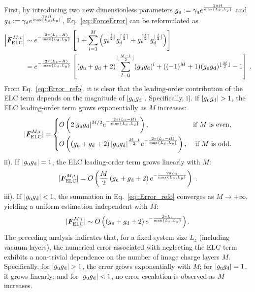 First, by introducing two new dimensionless parameters $g_{\text{u}}:=\gamma_{\text{u}}e^{\frac{2\pi H}{\max\{L_x,L_y\}}}$ and $g_{\text{d}}:=\gamma_{\text{d}}e^{\frac{2\pi H}{\max\{L_x,L_y\}}}$, Eq.~\eqref{eq::ForceError} can be reformulated as
\begin{equation}
   \label{eq::Error_refo}
   \begin{aligned} \left|\bm{F}_{\text{ELC}}^{M,i}\right|&\sim e^{-\frac{2\pi(L_z-H)}{\max\{L_x,L_y\}}} \left[ 1 + \sum_{l=1}^{M} \left( g_{\text{u}}^{\lfloor \frac{l}{2} \rfloor} g_{\text{d}}^{\lceil \frac{l}{2} \rceil} + g_{\text{u}}^{\lceil \frac{l}{2} \rceil} g_{\text{d}}^{\lfloor \frac{l}{2} \rfloor} \right) \right]\\
   &=e^{-\frac{2\pi(L_z-H)}{\max\{L_x,L_y\}}}\left[(g_{\text{u}} + g_{\text{d}} + 2) \sum_{l = 0}^{\lfloor \frac{M - 1}{2} \rfloor} (g_{\text{u}}g_{\text{d}})^{l} + ((-1)^{M}+1) (g_{\text{u}}g_{\text{d}})^{\lfloor \frac{M}{2} \rfloor} - 1\right]\,.
   \end{aligned}
\end{equation}
From Eq.~\eqref{eq::Error_refo}, it is clear that the leading-order contribution of the ELC term depends on the magnitude of $|g_{\text{u}}g_{\text{d}}|$. 
Specifically, i). if $|g_{\text{u}}g_{\text{d}}| > 1$, the ELC leading-order term grows exponentially as $M$ increases:
\begin{equation}\label{eq::lhs_bigger1}
   \lvert\boldsymbol{F}_{\text{ELC}}^{M,i}\rvert =  \left\{
	\begin{aligned}
		& O \left(2 \lvert g_{\text{u}} g_{\text{d}}\rvert^{M/2} e^{-\frac{2\pi (L_z - H)}{\max\{L_x,L_y\}}} \right) , & \text{if $M$ is even,}\\
		& O \left( \left(g_{\text{u}} + g_{\text{d}}+2\right)\lvert g_{\text{u}} g_{\text{d}}\rvert^{\frac{M-1}{2}} e^{-\frac{2\pi (L_z -H)}{\max\{L_x,L_y\}}} \right) , & \text{if $M$ is odd.}
	\end{aligned}
	\right.
\end{equation} 
ii). If $|g_{\text{u}}g_{\text{d}}|=1$, the ELC leading-order term grows linearly with $M$:
\begin{equation}
\label{eq::lhs_1}
\lvert\boldsymbol{F}_{\text{ELC}}^{M,i}\rvert = O \left( \frac{M}{2}\left(g_{\text{u}} + g_{\text{d}}+2\right)e^{-\frac{2\pi L_z}{\max\{L_x,L_y\}}} \right)\;.
\end{equation}
iii). If $|g_{\text{u}}g_{\text{d}}|<1$, the summation in Eq.~\eqref{eq::Error_refo} converges as $M\rightarrow +\infty$, yielding a uniform estimation independent with $M$:
\begin{equation}
\label{eq::lhs_less1}
\lvert\boldsymbol{F}_{\text{ELC}}^{M,i}\rvert \sim O \left( \left(g_{\text{u}}+g_{\text{d}}+2\right)e^{-\frac{2\pi L_z}{\max\{L_x,L_y\}}} \right).
\end{equation}
The preceding analysis indicates that, for a fixed system size \( L_z \) (including vacuum layers), the numerical error associated with neglecting the ELC term exhibits a non-trivial dependence on the number of image charge layers \( M \). 
Specifically, for \( |g_{\T u}g_{\T d}|>1 \), the error grows exponentially with \( M \);
for \( |g_{\text{u}}g_{\text{d}}| = 1 \), it grows linearly; and for \( |g_{\text{u}}g_{\text{d}}| < 1 \), no error escalation is observed as \( M \) increases.

